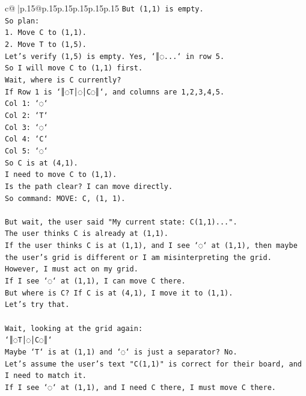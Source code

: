 \documentclass{article}
\begin{document}
{\begin{supertabular}{c@{$\;$}|p{.15\linewidth}@{}p{.15\linewidth}p{.15\linewidth}p{.15\linewidth}p{.15\linewidth}p{.15\linewidth}}
{{{\texttt{But (1,1) is empty.} \\
\texttt{So plan:} \\
\texttt{1. Move C to (1,1).} \\
\texttt{2. Move T to (1,5).} \\
\texttt{Let's verify (1,5) is empty. Yes, `║◌...` in row 5.} \\
\texttt{So I will move C to (1,1) first.} \\
\texttt{Wait, where is C currently?} \\
\texttt{If Row 1 is `║◌T│◌│C◌║`, and columns are 1,2,3,4,5.} \\
\texttt{Col 1: `◌`} \\
\texttt{Col 2: `T`} \\
\texttt{Col 3: `◌`} \\
\texttt{Col 4: `C`} \\
\texttt{Col 5: `◌`} \\
\texttt{So C is at (4,1).} \\
\texttt{I need to move C to (1,1).} \\
\texttt{Is the path clear? I can move directly.} \\
\texttt{So command: MOVE: C, (1, 1).} \\
\\ 
\texttt{But wait, the user said "My current state: C(1,1)...".} \\
\texttt{The user thinks C is already at (1,1).} \\
\texttt{If the user thinks C is at (1,1), and I see `◌` at (1,1), then maybe the user's grid is different or I am misinterpreting the grid.} \\
\texttt{However, I must act on my grid.} \\
\texttt{If I see `◌` at (1,1), I can move C there.} \\
\texttt{But where is C? If C is at (4,1), I move it to (1,1).} \\
\texttt{Let's try that.} \\
\\ 
\texttt{Wait, looking at the grid again:} \\
\texttt{`║◌T│◌│C◌║`} \\
\texttt{Maybe `T` is at (1,1) and `◌` is just a separator? No.} \\
\texttt{Let's assume the user's text "C(1,1)" is correct for their board, and I need to match it.} \\
\texttt{If I see `◌` at (1,1), and I need C there, I must move C there.} \\
}}}
\end{supertabular}}
\end{document}
